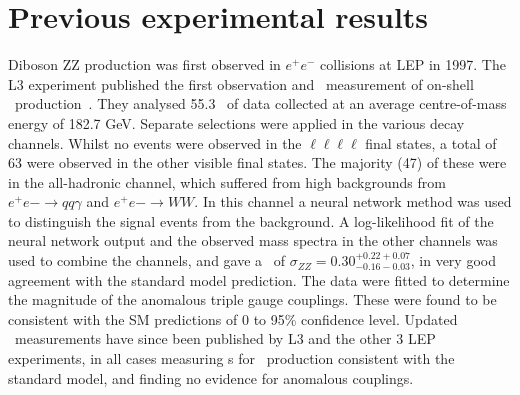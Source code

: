 
%
\section{Previous experimental results}

Diboson ZZ production was first observed in $e^+e^-$ collisions at LEP in 1997.
The L3 experiment published the first observation and \cx\ measurement
of on-shell \ZZ\ production~\cite{Acciarri1999281}. They analysed 55.3 \ipb\
of data collected at an average centre-of-mass energy of 182.7 GeV. Separate
selections were applied in the various decay channels. Whilst no events were
observed in the $\ell\ell\ell\ell$ final states, a total of 63 were observed in
the other visible final states. The majority (47) of these were in the
all-hadronic channel, which suffered from high backgrounds from $e^+e-
\rightarrow qq \gamma$ and $e^+e- \rightarrow WW$. In this channel a neural
network method was used to distinguish the signal events from the background. A
log-likelihood fit of the neural network output and the observed mass spectra in
the other channels was used to combine the channels, and gave a \cx\ of
$\sigma_{ZZ} = 0.30^{+0.22 +0.07}_{-0.16 -0.03}$, in very good agreement with
the standard model prediction. The data were fitted to determine the magnitude
of the anomalous triple gauge couplings. These were found to be consistent with
the SM predictions of 0 to 95\% confidence level. Updated \cx\
measurements have since been published by L3 and the other 3 LEP experiments, in
all cases measuring \cx s for \ZZ\ production consistent with the
standard model, and finding no evidence for anomalous couplings.

